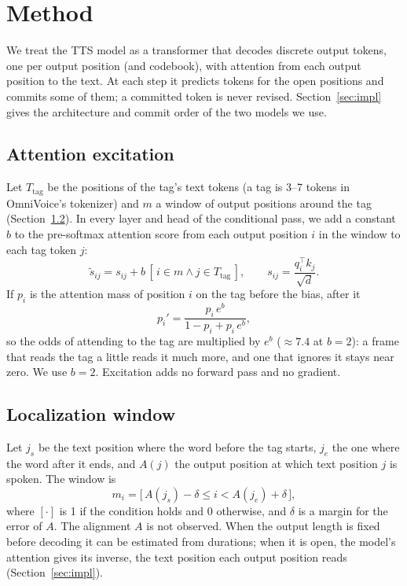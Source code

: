 \documentclass[11pt]{article}
\begin{document}
\section{Method}
\label{sec:method}
We treat the TTS model as a transformer that decodes discrete output tokens, one per output position (and codebook), with attention from each output position to the text. At each step it predicts tokens for the open positions and commits some of them; a committed token is never revised. Section~\ref{sec:impl} gives the architecture and commit order of the two models we use.

\subsection{Attention excitation}
\label{sec:excite}
Let $T_{\text{tag}}$ be the positions of the tag's text tokens (a tag is 3--7 tokens in OmniVoice's tokenizer) and $m$ a window of output positions around the tag (Section~\ref{sec:window}). In every layer and head of the conditional pass, we add a constant $b$ to the pre-softmax attention score from each output position $i$ in the window to each tag token $j$:
\begin{equation}
\tilde s_{ij} = s_{ij} + b\,[\,i \in m \wedge j \in T_{\text{tag}}\,], \qquad s_{ij} = \frac{q_i^\top k_j}{\sqrt d}.
\label{eq:excite}
\end{equation}
If $p_i$ is the attention mass of position $i$ on the tag before the bias, after it
\begin{equation}
p_i' = \frac{p_i\, e^b}{1 - p_i + p_i\, e^b},
\label{eq:odds}
\end{equation}
so the odds of attending to the tag are multiplied by $e^b$ ($\approx 7.4$ at $b = 2$): a frame that reads the tag a little reads it much more, and one that ignores it stays near zero. We use $b = 2$. Excitation adds no forward pass and no gradient.

\subsection{Localization window}
\label{sec:window}
Let $j_s$ be the text position where the word before the tag starts, $j_e$ the one where the word after it ends, and $A(j)$ the output position at which text position $j$ is spoken. The window is
\begin{equation}
m_i = \big[\,A(j_s) - \delta \le i < A(j_e) + \delta\,\big],
\label{eq:window}
\end{equation}
where $[\cdot]$ is 1 if the condition holds and 0 otherwise, and $\delta$ is a margin for the error of $A$. The alignment $A$ is not observed. When the output length is fixed before decoding it can be estimated from durations; when it is open, the model's attention gives its inverse, the text position each output position reads (Section~\ref{sec:impl}).
\end{document}
